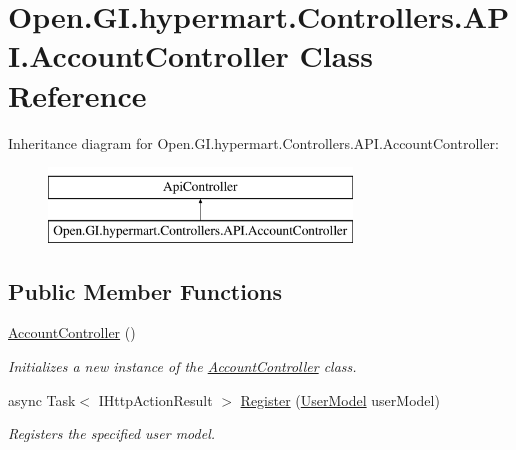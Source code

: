 \hypertarget{class_open_1_1_g_i_1_1hypermart_1_1_controllers_1_1_a_p_i_1_1_account_controller}{}\section{Open.\+G\+I.\+hypermart.\+Controllers.\+A\+P\+I.\+Account\+Controller Class Reference}
\label{class_open_1_1_g_i_1_1hypermart_1_1_controllers_1_1_a_p_i_1_1_account_controller}


 


Inheritance diagram for Open.\+G\+I.\+hypermart.\+Controllers.\+A\+P\+I.\+Account\+Controller\+:\begin{figure}[H]
\begin{center}
\leavevmode
\includegraphics[height=2.000000cm]{class_open_1_1_g_i_1_1hypermart_1_1_controllers_1_1_a_p_i_1_1_account_controller}
\end{center}
\end{figure}
\subsection*{Public Member Functions}
\begin{DoxyCompactItemize}
\item 
\hyperlink{class_open_1_1_g_i_1_1hypermart_1_1_controllers_1_1_a_p_i_1_1_account_controller_ad19bf4f799cb21b28dc2e92454deca5f}{Account\+Controller} ()
\begin{DoxyCompactList}\small\item\em Initializes a new instance of the \hyperlink{class_open_1_1_g_i_1_1hypermart_1_1_controllers_1_1_a_p_i_1_1_account_controller}{Account\+Controller} class. \end{DoxyCompactList}\item 
async Task$<$ I\+Http\+Action\+Result $>$ \hyperlink{class_open_1_1_g_i_1_1hypermart_1_1_controllers_1_1_a_p_i_1_1_account_controller_af7539d8bf4d884854d63a75733ce93e9}{Register} (\hyperlink{class_open_1_1_g_i_1_1hypermart_1_1_models_1_1_user_model}{User\+Model} user\+Model)
\begin{DoxyCompactList}\small\item\em Registers the specified user model. \end{DoxyCompactList}\end{DoxyCompactItemize}

